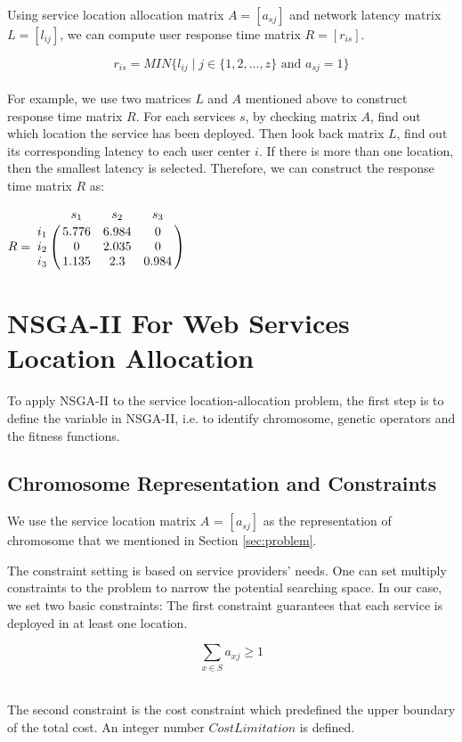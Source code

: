 \documentclass{llncs}
\let\bbordermatrix\bordermatrix
\begin{document}
Using service location allocation matrix $A = [a_{sj}]$ and network latency matrix $L = [l_{ij}]$, we can compute user
response time matrix $R = [r_{is}]$. 

{\centering
	\begin{equation}
		r_{is} = MIN\{l_{ij} \mid j \in \{1, 2, ..., z\} \text{ and } a_{sj} = 1\}
	\end{equation}
\\}
For example, we use two matrices $L$ and $A$ mentioned above to construct response time matrix $R$. 
For each services $s$, by checking matrix $A$, find out which location the service has been deployed.
Then look back matrix $L$, find out its corresponding latency to each user center $i$. If there is
more than one location, then the smallest latency is selected. Therefore, we can construct the response time matrix $R$ as:

{\centering
$
R = \bbordermatrix{~ & s_{1} & s_{2} & s_{3}\cr
					i_{1}	&5.776 &6.984 &0	\cr
					i_{2}	&0  &2.035 &0	\cr
					i_{3}	&1.135 &2.3 &0.984	\cr}
$
\\}


\section{NSGA-II For Web Services Location Allocation}
\label{sec:algorithm_des}
To apply NSGA-II to the service location-allocation problem, the first step is to define the variable in NSGA-II, i.e. to
identify chromosome, genetic operators and the fitness functions.

\subsection{Chromosome Representation and Constraints}
We use the service location matrix $A$ = $[a_{sj}]$ as the representation of chromosome that we mentioned in Section 
\ref{sec:problem}.

The constraint setting is based on service providers' needs. One can set multiply constraints to the problem to narrow the potential searching space.
In our case, we set two basic constraints: The first constraint guarantees that each service is deployed in at 
least one location.

{\centering
	\begin{equation}
		\sum\limits_{x \in S} a_{xj} \geq 1
	\end{equation}
\\}

The second constraint is the cost constraint which predefined the upper boundary of the total cost.
An integer number $CostLimitation$ is defined.
\end{document}
